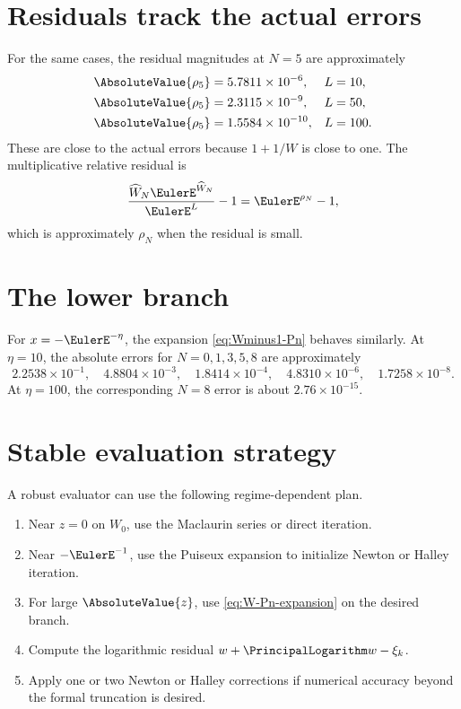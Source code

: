 \documentclass[11pt,openany]{book}
\theoremstyle{definition}
\theoremstyle{plain}
\theoremstyle{remark}
\newcommand{\LambertAsymptoticApproximation}[1]{\widehat{W}_{#1}}
\begin{document}
\section{Residuals track the actual errors}
For the same cases, the residual magnitudes at \(N=5\) are approximately
\begin{align*}
 \AbsoluteValue{\rho_5}&=5.7811\times10^{-6},&&L=10,\\
 \AbsoluteValue{\rho_5}&=2.3115\times10^{-9},&&L=50,\\
 \AbsoluteValue{\rho_5}&=1.5584\times10^{-10},&&L=100.
\end{align*}
These are close to the actual errors because \(1+1/W\) is close to one. The multiplicative relative residual is
\[
 \frac{\LambertAsymptoticApproximation{N}\EulerE^{\LambertAsymptoticApproximation{N}}}{\EulerE^L}-1=\EulerE^{\rho_N}-1,
\]
which is approximately \(\rho_N\) when the residual is small.

\section{The lower branch}
For \(x=-\EulerE^{-\eta}\), the expansion \cref{eq:Wminus1-Pn} behaves similarly. At \(\eta=10\), the absolute errors for \(N=0,1,3,5,8\) are approximately
\[
 2.2538\times10^{-1},\quad
 4.8804\times10^{-3},\quad
 1.8414\times10^{-4},\quad
 4.8310\times10^{-6},\quad
 1.7258\times10^{-8}.
\]
At \(\eta=100\), the corresponding \(N=8\) error is about \(2.76\times10^{-15}\).

\section{Stable evaluation strategy}
A robust evaluator can use the following regime-dependent plan.
\begin{enumerate}
\item Near \(z=0\) on \(W_0\), use the Maclaurin series or direct iteration.
\item Near \(-\EulerE^{-1}\), use the Puiseux expansion to initialize Newton or Halley iteration.
\item For large \(\AbsoluteValue{z}\), use \cref{eq:W-Pn-expansion} on the desired branch.
\item Compute the logarithmic residual \(w+\PrincipalLogarithm w-\xi_k\).
\item Apply one or two Newton or Halley corrections if numerical accuracy beyond the formal truncation is desired.
\end{enumerate}
\end{document}
